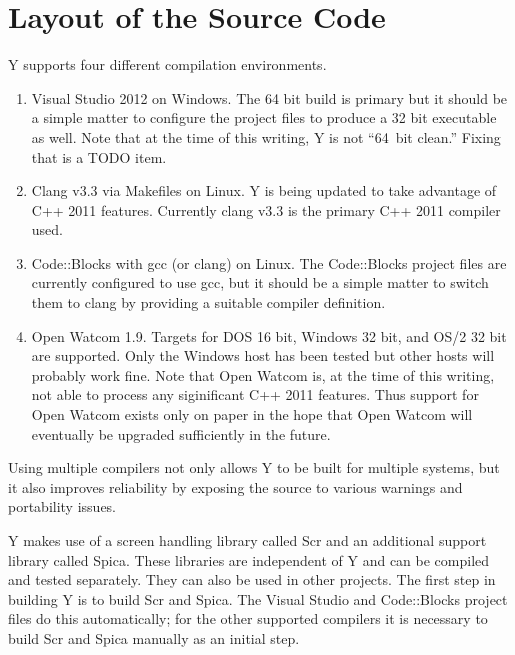 \section{Layout of the Source Code}

Y supports four different compilation environments.

\begin{enumerate}

\item Visual Studio 2012 on Windows. The 64 bit build is primary but it should be a simple
matter to configure the project files to produce a 32 bit executable as well. Note that at
the time of this writing, Y is not ``64~bit clean.'' Fixing that is a TODO item.

\item Clang v3.3 via Makefiles on Linux. Y is being updated to take advantage of C++ 2011
features. Currently clang v3.3 is the primary C++ 2011 compiler used.

\item Code::Blocks with gcc (or clang) on Linux. The Code::Blocks project files are currently
configured to use gcc, but it should be a simple matter to switch them to clang by providing
a suitable compiler definition.

\item Open Watcom 1.9. Targets for DOS 16 bit, Windows 32 bit, and OS/2 32 bit are supported.
Only the Windows host has been tested but other hosts will probably work fine. Note that
Open Watcom is, at the time of this writing, not able to process any siginificant C++ 2011
features. Thus support for Open Watcom exists only on paper in the hope that Open Watcom will
eventually be upgraded sufficiently in the future.

\end{enumerate}

Using multiple compilers not only allows Y to be built for multiple systems, but it also
improves reliability by exposing the source to various warnings and portability issues.

Y makes use of a screen handling library called Scr and an additional support library called
Spica. These libraries are independent of Y and can be compiled and tested separately. They can
also be used in other projects. The first step in building Y is to build Scr and Spica. The
Visual Studio and Code::Blocks project files do this automatically; for the other supported
compilers it is necessary to build Scr and Spica manually as an initial step.

